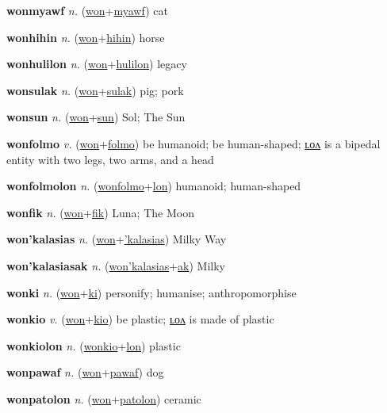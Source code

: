 \textbf{\hypertarget{wonmyawf}{wonmyawf}} \textit{n.} (\hyperlink{won}{won}+\allowbreak \hyperlink{myawf}{myawf})
cat

\textbf{\hypertarget{wonhihin}{wonhihin}} \textit{n.} (\hyperlink{won}{won}+\allowbreak \hyperlink{hihin}{hihin})
horse

\textbf{\hypertarget{wonhulilon}{wonhulilon}} \textit{n.} (\hyperlink{won}{won}+\allowbreak \hyperlink{hulilon}{hulilon})
legacy

\textbf{\hypertarget{wonsulak}{wonsulak}} \textit{n.} (\hyperlink{won}{won}+\allowbreak \hyperlink{sulak}{sulak})
pig; pork

\textbf{\hypertarget{wonsun}{wonsun}} \textit{n.} (\hyperlink{won}{won}+\allowbreak \hyperlink{sun}{sun})
Sol; The Sun

\textbf{\hypertarget{wonfolmo}{wonfolmo}} \textit{v.} (\hyperlink{won}{won}+\allowbreak \hyperlink{folmo}{folmo})
be humanoid; be human-shaped; \hyperlink{wonfolmolon}{ʟᴏᴧ} is a bipedal entity with two legs, two arms, and a head

\textbf{\hypertarget{wonfolmolon}{wonfolmolon}} \textit{n.} (\hyperlink{wonfolmo}{wonfolmo}+\allowbreak \hyperlink{lon}{lon})
humanoid; human-shaped

\textbf{\hypertarget{wonfik}{wonfik}} \textit{n.} (\hyperlink{won}{won}+\allowbreak \hyperlink{fik}{fik})
Luna; The Moon

\textbf{\hypertarget{won'kalasias}{won'kalasias}} \textit{n.} (\hyperlink{won}{won}+\allowbreak \hyperlink{'kalasias}{'kalasias})
Milky Way

\textbf{\hypertarget{won'kalasiasak}{won'kalasiasak}} \textit{n.} (\hyperlink{won'kalasias}{won'kalasias}+\allowbreak \hyperlink{ak}{ak})
Milky

\textbf{\hypertarget{wonki}{wonki}} \textit{n.} (\hyperlink{won}{won}+\allowbreak \hyperlink{ki}{ki})
personify; humanise; anthropomorphise

\textbf{\hypertarget{wonkio}{wonkio}} \textit{v.} (\hyperlink{won}{won}+\allowbreak \hyperlink{kio}{kio})
be plastic; \hyperlink{wonkiolon}{ʟᴏᴧ} is made of plastic

\textbf{\hypertarget{wonkiolon}{wonkiolon}} \textit{n.} (\hyperlink{wonkio}{wonkio}+\allowbreak \hyperlink{lon}{lon})
plastic

\textbf{\hypertarget{wonpawaf}{wonpawaf}} \textit{n.} (\hyperlink{won}{won}+\allowbreak \hyperlink{pawaf}{pawaf})
dog

\textbf{\hypertarget{wonpatolon}{wonpatolon}} \textit{n.} (\hyperlink{won}{won}+\allowbreak \hyperlink{patolon}{patolon})
ceramic

